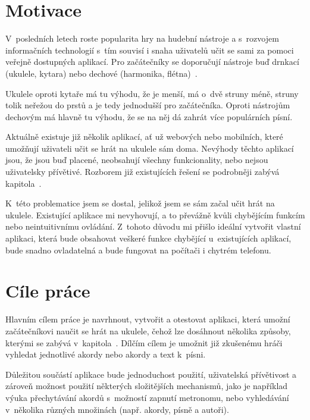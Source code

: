 \begin{introduction}
    \label{ch:introduction}
    \section{Motivace}
    V~posledních letech roste popularita hry na hudební nástroje a s~rozvojem informačních technologií s~tím souvisí i snaha uživatelů učit se sami za pomoci veřejně dostupných aplikací. Pro začátečníky se doporučují nástroje buď drnkací (ukulele, kytara) nebo dechové (harmonika, flétna)~\cite{s_2016_the, richardson_2019_top}.

    Ukulele oproti kytaře má tu výhodu, že je menší, má o~dvě struny méně, struny tolik neřežou do prstů a je tedy jednodušší pro začátečníka. Oproti nástrojům dechovým má hlavně tu výhodu, že se na něj dá zahrát více populárních písní.

    Aktuálně existuje již několik aplikací, ať už webových nebo mobilních, které umožňují uživateli učit se hrát na ukulele sám doma. Nevýhody těchto aplikací jsou, že jsou buď placené, neobsahují všechny funkcionality, nebo nejsou uživatelsky přívětivé. Rozborem již existujících řešení se podrobněji zabývá kapitola~.

    K~této problematice jsem se dostal, jelikož jsem se sám začal učit hrát na ukulele. Existující aplikace mi nevyhovují, a to převážně kvůli chybějícím funkcím nebo neintuitivnímu ovládání. Z~tohoto důvodu mi přišlo ideální vytvořit vlastní aplikaci, která bude obsahovat veškeré funkce chybějící u~existujících aplikací, bude snadno ovladatelná a bude fungovat na počítači i chytrém telefonu.


    \section{Cíle práce}
    Hlavním cílem práce je navrhnout, vytvořit a otestovat aplikaci, která umožní začátečníkovi naučit se hrát na ukulele, čehož lze dosáhnout několika způsoby, kterými se zabývá v~kapitola~. Dílčím cílem je umožnit již zkušenému hráči vyhledat jednotlivé akordy nebo akordy a text k~písni.

    Důležitou součástí aplikace bude jednoduchost použití, uživatelská přívětivost a zároveň možnost použití některých složitějších mechanismů, jako je například výuka přechytávání akordů s~možností zapnutí metronomu, nebo vyhledávání v~několika různých množinách (např. akordy, písně a autoři).


\end{introduction}
